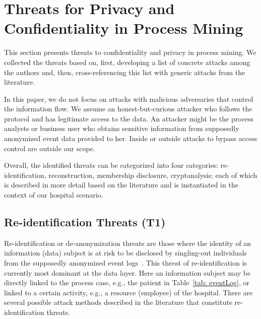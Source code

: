\documentclass[manuscript]{acmart}
\begin{document}
\section{Threats for Privacy and Confidentiality in Process Mining}
\label{sec-threats}
This section presents threats to confidentiality and privacy in process mining. We collected the threats based on, first, developing a list of concrete attacks among the authors and, then, cross-referencing this list with generic attacks from the literature.

In this paper, we do not focus on attacks with malicious adversaries that control the information flow. We assume an honest-but-curious attacker who follows the protocol and has legitimate access to the data. An attacker might be the process analysts or business user who obtains sensitive information from supposedly anonymized event data provided to her. Inside or outside attacks to bypass access control are outside our scope. 

Overall, the identified threats can be categorized into four categories: re-identification, reconstruction, membership disclosure, cryptanalysis; each of which is described in more detail based on the literature and is instantiated in the context of our hospital scenario.

\subsection{Re-identification Threats (T1)}
Re-identification or de-anonymization threats are those where the identity of an information (data) subject is at risk to be disclosed by singling-out individuals from the supposedly anonymized event logs~\cite{dwork17}. This threat of re-identification is currently most dominant at the data layer. Here an information subject may be directly linked to the process case, e.g., the patient in Table~\ref{tab: eventLog}, or linked to a certain activity, e.g., a resource (employee) of the hospital.
There are several possible attack methods described in the literature that constitute re-identification threats. 
\end{document}
